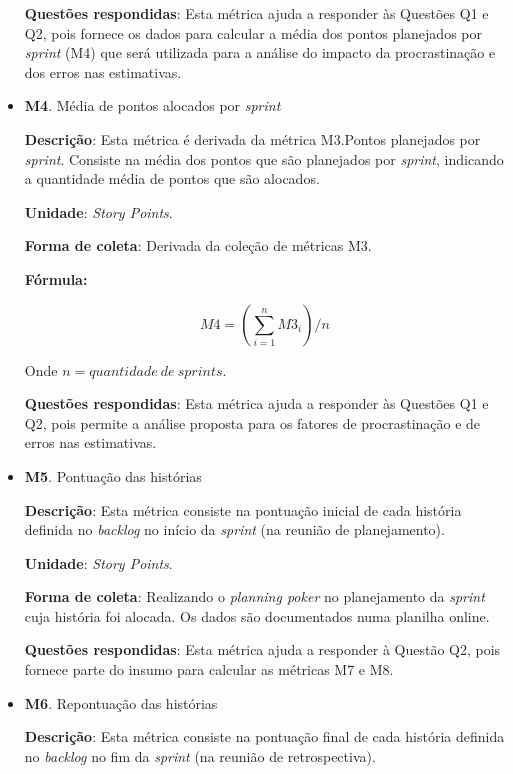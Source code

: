 \begin{itemize}
	   \subitem \textbf{Questões respondidas}: Esta métrica ajuda a responder às Questões Q1 e Q2, pois fornece os dados para
		    calcular a média dos pontos planejados por \textit{sprint} (M4) que será utilizada para a análise do impacto
		    da procrastinação e dos erros nas estimativas.

	 \item \textbf{M4}. Média de pontos alocados por \textit{sprint}

	   \subitem \textbf{Descrição}: Esta métrica é derivada da métrica M3.Pontos planejados por \textit{sprint}.
		    Consiste na média dos pontos que são planejados por \textit{sprint}, indicando a quantidade média
		    de pontos que são alocados.

	   \subitem \textbf{Unidade}: \textit{Story Points}.

	   \subitem \textbf{Forma de coleta}: Derivada da coleção de métricas M3.

	      \subsubitem \textbf{Fórmula:}

		$$ M4 = (\sum\limits_{i=1}^{n}M3_i)/n $$

	      \subsubitem Onde $n = quantidade\ de\ sprints$.

	   \subitem \textbf{Questões respondidas}: Esta métrica ajuda a responder às Questões Q1 e Q2, pois permite a análise
		    proposta para os fatores de procrastinação e de erros nas estimativas.

	 \item \textbf{M5}. Pontuação das histórias

	   \subitem \textbf{Descrição}: Esta métrica consiste na pontuação inicial de cada história definida no \textit{backlog} no início
		    da \textit{sprint} (na reunião de planejamento).

	   \subitem \textbf{Unidade}: \textit{Story Points}.

	   \subitem \textbf{Forma de coleta}: Realizando o \textit{planning poker} no planejamento da \textit{sprint}
		    cuja história foi alocada. Os dados são documentados numa planilha online.

	   \subitem \textbf{Questões respondidas}: Esta métrica ajuda a responder à Questão Q2, pois fornece parte do insumo para calcular
		    as métricas M7 e M8.

	 \item \textbf{M6}. Repontuação das histórias

	   \subitem \textbf{Descrição}: Esta métrica consiste na pontuação final de cada história definida no \textit{backlog} no fim
		    da \textit{sprint} (na reunião de retrospectiva).


\end{itemize}
